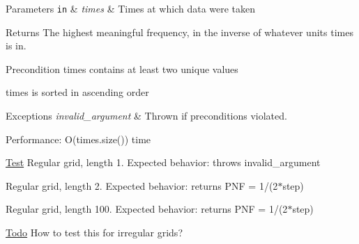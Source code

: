 \begin{DoxyParams}[1]{Parameters}
\mbox{\tt in}  & {\em times} & Times at which data were taken\\
\hline
\end{DoxyParams}
\begin{DoxyReturn}{Returns}
The highest meaningful frequency, in the inverse of whatever units times is in.
\end{DoxyReturn}
\begin{DoxyPrecond}{Precondition}
times contains at least two unique values 

times is sorted in ascending order 
\end{DoxyPrecond}

\begin{DoxyExceptions}{Exceptions}
{\em invalid\_\-argument} & Thrown if preconditions violated.\\
\hline
\end{DoxyExceptions}
\begin{DoxyParagraph}{Performance:}
O(times.size()) time
\end{DoxyParagraph}
\begin{Desc}
\item[\hyperlink{test__test000004}{Test}]Regular grid, length 1. Expected behavior: throws invalid\_\-argument 

Regular grid, length 2. Expected behavior: returns PNF = 1/(2$\ast$step) 

Regular grid, length 100. Expected behavior: returns PNF = 1/(2$\ast$step) \end{Desc}
\begin{Desc}
\item[\hyperlink{todo__todo000010}{Todo}]How to test this for irregular grids? \end{Desc}
